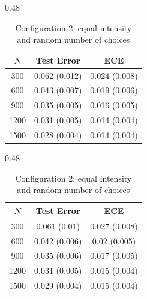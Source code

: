 \documentclass[12pt]{amsart}
\theoremstyle{plain}
\theoremstyle{remark}
\numberwithin{equation}{section}
\begin{document}
\begin{table}[htbp]
\centering
\renewcommand{\arraystretch}{0.75}

\begin{subtable}{0.48\textwidth}
\setlength{\tabcolsep}{10pt}
\begin{tabular}{ccc}
\toprule
$N$ & Test Error & ECE \\
\midrule
300  & 0.062 (0.012) & 0.024 (0.008) \\
600  & 0.043 (0.007) & 0.019 (0.006) \\
900  & 0.035 (0.005) & 0.016 (0.005) \\
1200 & 0.031 (0.005) & 0.014 (0.004) \\
1500 & 0.028 (0.004) & 0.014 (0.004) \\
\bottomrule
\end{tabular}
\centering
\caption{\centering Configuration 1: equal intensity \\ and constant number of choices}
\end{subtable}
\hfill
\begin{subtable}{0.48\textwidth}
\setlength{\tabcolsep}{10pt}
\begin{tabular}{ccc}
\toprule
$N$ & Test Error & ECE \\
\midrule
300  & 0.061 (0.01) & 0.027 (0.008) \\
600  & 0.042 (0.006) & 0.02 (0.005) \\
900  & 0.035 (0.006) & 0.017 (0.005) \\
1200 & 0.031 (0.005) & 0.015 (0.004) \\
1500 & 0.029 (0.004) & 0.015 (0.004) \\
\bottomrule
\end{tabular}
\centering
\caption{\centering Configuration 2: equal intensity \\ and random number of choices}
\end{subtable}

\vspace{0.4cm}


\end{table}
\end{document}
